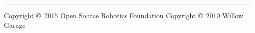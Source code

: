 \documentclass[10pt,landscape]{article}
\newif\ifcatkin
\begin{document}
\begin{multicols}{3}
\vspace{45mm}

\else %

\vspace{17cm}

\fi %


\rule{0.3\linewidth}{0.25pt}

\scriptsize

Copyright \copyright\ 2015 Open Source Robotics Foundation
Copyright \copyright\ 2010 Willow Garage
\vspace{3000 mm}


\end{multicols}
\end{document}
